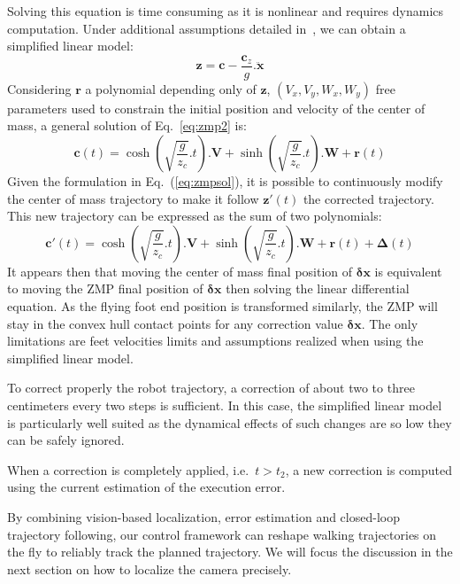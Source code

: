 Solving this equation is time consuming as it is nonlinear and requires dynamics computation. Under additional assumptions detailed in~\cite{Kajita01iros}, we can obtain a simplified linear model:
%
\begin{equation} \label{eq:zmp2}
  \mathbf{z} = \mathbf{c} - \frac{\mathbf{c}_z}{g} . \ddot{\mathbf{x}}
\end{equation}
%
Considering $\mathbf{r}$ a polynomial depending only of $\mathbf{z}$, $(V_x, V_y, W_x, W_y)$ free parameters used to constrain the initial position and velocity of the center of mass, a general solution of
Eq.~\ref{eq:zmp2} is:
%
\begin{equation} \label{eq:zmpsol}
  \mathbf{c}(t) = \cosh(\sqrt{\frac{g}{z_c}}.t) . \mathbf{V} + \sinh(\sqrt{\frac{g}{z_c}}.t) . \mathbf{W} + \mathbf{r}(t)
\end{equation}
%
Given the formulation in Eq.~(\ref{eq:zmpsol}), it is possible to continuously modify the center of mass trajectory to make it follow \mbox{$\mathbf{z}'(t)$} the corrected trajectory. This new trajectory can be expressed as the sum of two polynomials:
%
\begin{equation} \label{eq:zmpsolcor}
  \mathbf{c}'(t) = \cosh(\sqrt{\frac{g}{z_c}}.t) . \mathbf{V} +
  \sinh(\sqrt{\frac{g}{z_c}}.t) . \mathbf{W} + \mathbf{r}(t) + \mathbf{\Delta}(t)
\end{equation}
%
It appears then that moving the center of mass final position of $\mathbf{\delta x}$ is equivalent to moving the ZMP final position of $\mathbf{\delta x}$ then solving the linear differential equation. As
the flying foot end position is transformed similarly, the ZMP will stay in the convex hull contact points for any correction value $\mathbf{\delta x}$. The only limitations are feet velocities limits
and assumptions realized when using the simplified linear model.

To correct properly the robot trajectory, a correction of about two to three centimeters every two steps is sufficient. In this case, the simplified linear model is particularly well suited as the dynamical
effects of such changes are so low they can be safely ignored.

When a correction is completely applied, i.e.\ $t > t_2$, a new correction is computed using the current estimation of the execution error.

By combining vision-based localization, error estimation and closed-loop trajectory following, our control framework can reshape walking trajectories on the fly to reliably track the planned trajectory. We will focus the discussion in the next section on how to localize the camera precisely.

